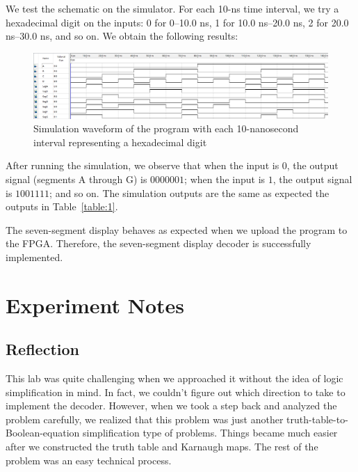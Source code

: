 \documentclass[12pt]{article}
\begin{document}
We test the schematic on the simulator. For each 10-ns time interval, we try a hexadecimal digit on the inputs: 0 for 0--10.0 ns, 1 for 10.0 ns--20.0 ns, 2 for 20.0 ns--30.0 ns, and so on. We obtain the following results:

\begin{figure}[h]
  \centering
  \includegraphics[width=\textwidth]{lab3_simulation.png}
  \caption{Simulation waveform of the program with each 10-nanosecond interval representing a hexadecimal digit}
  \label{figure:5}
\end{figure}

After running the simulation, we observe that when the input is $0$, the output signal (segments A through G) is $0000001$; when the input is $1$, the output signal is $1001111$; and so on. The simulation outputs are the same as expected the outputs in Table~\ref{table:1}.

The seven-segment display behaves as expected when we upload the program to the FPGA. Therefore, the seven-segment display decoder is successfully implemented.

\section{Experiment Notes}

\subsection*{Reflection}

This lab was quite challenging when we approached it without the idea of logic simplification in mind. In fact, we couldn't figure out which direction to take to implement the decoder. However, when we took a step back and analyzed the problem carefully, we realized that this problem was just another truth-table-to-Boolean-equation simplification type of problems. Things became much easier after we constructed the truth table and Karnaugh maps. The rest of the problem was an easy technical process.
\end{document}
